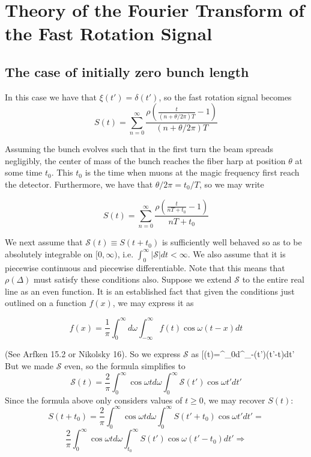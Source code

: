 \newpage
\section{Theory of the Fourier Transform of the Fast Rotation Signal}

\subsection{The case of initially zero bunch length}

In this case we have that $\xi(t')=\delta(t')$, so the fast rotation signal becomes \[S(t)=\sum^{\infty}_{n=0}\frac{\rho\left(\frac{t}{(n+\theta/2\pi)T}-1\right)}{(n+\theta/2\pi)T}\]

Assuming the bunch evolves such that in the first turn the beam spreads negligibly, the center of mass of the bunch reaches the fiber harp at position $\theta$ at some time $t_0$. This $t_0$ is the time when muons at the magic frequency first reach the detector. Furthermore, we have that $\theta/2\pi=t_0/T$, so we may write 

\begin{equation}
S(t)=\sum^{\infty}_{n=0}\frac{\rho\left(\frac{t}{nT+t_0}-1\right)}{nT+t_0}
\end{equation}

We next assume that $\mathcal{S}(t)\equiv S(t+t_0)$ is sufficiently well behaved so as to be absolutely integrable on $[0,\infty)$, i.e. $\int^{\infty}_0|\mathcal{S}|dt<\infty$. We also assume that it is piecewise continuous and piecewise differentiable. Note that this means that $\rho(\Delta)$ must satisfy these conditions also. Suppose we extend $\mathcal{S}$ to the entire real line as an even function. It is an established fact that given the conditions just outlined on a function $f(x)$, we may express it as 

\begin{equation}
f(x)=\frac{1}{\pi}\int^{\infty}_0d\omega\int^{\infty}_{-\infty}f(t)\cos\omega(t-x)dt
\end{equation}

(See Arfken 15.2 or Nikolsky 16). So we express $\mathcal{S}$ as [(t)=\int^{\infty}_0d\omega\int^{\infty}_{-\infty}(t')\cos\omega(t'-t)dt'\]  But we made $\mathcal{S}$ even, so the formula simplifies to \[\mathcal{S}(t)=\frac{2}{\pi}\int^{\infty}_0\cos\omega td\omega\int^{\infty}_0\mathcal{S}(t')\cos\omega t'dt'\] Since the formula above only considers values of $t\geq0$, we may recover $S(t)$:\[S(t+t_0)=\frac{2}{\pi}\int^{\infty}_0\cos\omega td\omega\int^{\infty}_0S(t'+t_0)\cos\omega t'dt'=\]\[\frac{2}{\pi}\int^{\infty}_0\cos\omega td\omega\int^{\infty}_{t_0}S(t')\cos\omega(t'-t_0)dt'\Rightarrow\]

